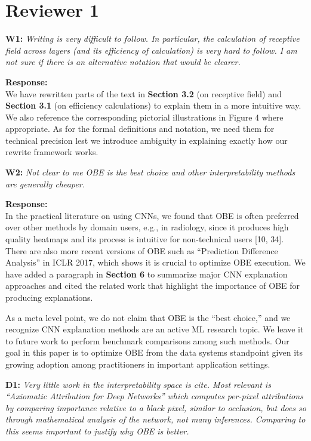\documentclass[preprint]{vldb}
\begin{document}
\section{Reviewer 1}

\vspace{2mm}
\noindent \textbf{W1:} \textit{Writing is very difficult to follow. In particular, the calculation of receptive field across layers (and its efficiency of calculation) is very hard to follow. I am not sure if there is an alternative notation that would be clearer.}

\vspace{2mm}
\noindent \textbf{Response:}\\
We have rewritten parts of the text in \textbf{Section 3.2} (on receptive field) and \textbf{Section 3.1} (on efficiency calculations) to explain them in a more intuitive way. We also reference the corresponding pictorial illustrations in Figure 4 where appropriate. As for the formal definitions and notation, we need them for technical precision lest we introduce ambiguity in explaining exactly how our rewrite framework works.

\vspace{2mm}
\noindent \textbf{W2:} \textit{Not clear to me OBE is the best choice and other interpretability methods are generally cheaper.}

\vspace{2mm}
\noindent \textbf{Response:} \\
In the practical literature on using CNNs, we found that OBE is often preferred over other methods by domain users, e.g., in radiology, since it produces high quality heatmaps and its process is intuitive for  non-technical users [10, 34]. There are also more recent versions of OBE such as ``Prediction Difference Analysis'' in ICLR 2017, which shows it is crucial to optimize OBE execution. We have added a paragraph in \textbf{Section 6} to summarize major CNN explanation approaches and cited the related work that highlight the importance of OBE for producing explanations. 

As a meta level point, we do not claim that OBE is the ``best choice,'' and we recognize CNN explanation methods are an active ML research topic. We leave it to future work to perform benchmark comparisons among such methods. Our goal in this paper is to optimize OBE from the data systems standpoint given its growing adoption among practitioners in important application settings. 

\vspace{2mm}
\noindent \textbf{D1:} \textit{Very little work in the interpretability space is cite. Most relevant is ``Axiomatic Attribution for Deep Networks'' which computes per-pixel attributions by comparing importance relative to a black pixel, similar to occlusion, but does so through mathematical analysis of the network, not many inferences. Comparing to this seems important to justify why OBE is better.}
\end{document}
